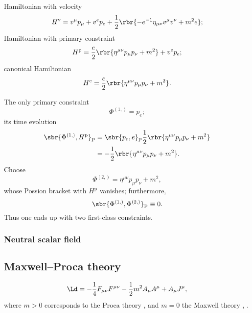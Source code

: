 \documentclass[a4paper,11pt]{article}
\begin{document}
Hamiltonian with velocity
\begin{equation}
H^\text{v} = v^\mu p_\mu + v^e p_e + \frac{1}{2} \rbr{-e^{-1} \eta_{\mu\nu} 
v^\mu v^\nu + m^2 e};
\end{equation}
Hamiltonian with primary constraint
\begin{equation}
H^\text{p} = \frac{e}{2} \rbr{\eta^{\mu\nu}p_\mu p_\nu + m^2} + v^e p_e;
\end{equation}
canonical Hamiltonian
\begin{equation}
H^\text{c} = \frac{e}{2} \rbr{\eta^{\mu\nu}p_\mu p_\nu + m^2}.
\end{equation}

The only primary constraint
\begin{equation}
\Phi^{(1,)} = p_e;
\end{equation}
its time evolution
\begin{align}
\sbr{\Phi^{(1,)}, H^\text{p}}_\text{P} &=
\sbr{p_e, e}_\text{P}\frac{1}{2}\rbr{\eta^{\mu\nu}p_\mu p_\nu + m^2}
\nonumber \\
&= -\frac{1}{2}\rbr{\eta^{\mu\nu}p_\mu p_\nu + m^2}.
\end{align}
Choose
\begin{equation}
\Phi^{(2,)} = \eta^{\mu\nu}p_\mu p_\nu + m^2,
\end{equation}
whose Possion bracket with $H^\text{p}$ vanishes; furthermore,
\begin{equation}
\sbr{\Phi^{(1,)},\Phi^{(2,)}}_\text{P} \equiv 0.
\end{equation}
Thus one ends up with two first-class constraints.



\subsubsection{Neutral scalar field}
\cite[sec.\ 3.3]{Kiefer2012}

\subsection{Maxwell--Proca theory}

\begin{equation}
\Ld = -\frac{1}{4} F_{\mu\nu} F^{\mu\nu} - \frac{1}{2} m^2 A_\mu A^\mu
+ A_\mu J^\mu,
\end{equation}
where $m > 0$ corresponds to the Proca theory \cite[sec.\ 2.3]{Gitman1990}, and 
$m = 0$ the Maxwell theory \cite[sec.\ 3.3.3]{Rothe2010}, \cite[sec.\ 
2.4]{Gitman1990}.
\end{document}
